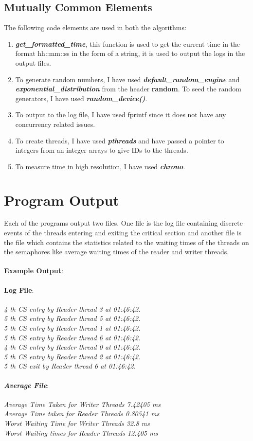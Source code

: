 \documentclass[a4paper,12pt]{report}
\begin{document}
\subsection{Mutually Common Elements}
The following code elements are used in both the algorithms:
\begin{enumerate}
\item \textbf{\textit{get\_formatted\_time}}, this function is used to get the current time in the format hh::mm::ss in the form of a string, it is used to output the logs in the output  files.
\item To generate random numbers, I have used \textbf{\textit{default\_random\_engine}} and  \textbf{\textit{exponential\_distribution}} from the header \textbf{random}. To seed the random generators, I have used \textit{\textbf{random\_device{}()}}.
\item To output to the log file, I have used fprintf since it does not have any concurrency related issues.
\item To create threads, I have used \textit{\textbf{pthreads}} and have passed a pointer to integers from an integer arrays to give IDs to the threads.
\item To measure time in high resolution, I have used \textit{\textbf{chrono}}.
\end{enumerate}
\newpage
\section{Program Output}
Each of the programs output two files. One file is the log file containing discrete events of the threads entering and exiting the critical section and another file is the file which contains the statistics related to the waiting times of the threads on the semaphores like average waiting times of the reader and writer threads.\\\\
\textbf{Example Output}:\\\\
\textbf{Log File}:\\\\
\textit{4 th CS entry by Reader thread 3 at 01:46:42.\\
5 th CS entry by Reader thread 5 at 01:46:42.\\
5 th CS entry by Reader thread 1 at 01:46:42.\\
5 th CS entry by Reader thread 6 at 01:46:42.\\
4 th CS entry by Reader thread 0 at 01:46:42.\\
5 th CS entry by Reader thread 2 at 01:46:42.\\
5 th CS exit by Reader thread 6 at 01:46:42.\\\\}
\textit{\textbf{Average File}}:\\\\
\textit{Average Time Taken for Writer Threads 7.42405 ms\\
Average Time taken for Reader Threads 0.80541 ms\\
Worst Waiting Time for Writer Threads 32.8 ms\\
Worst Waiting times for Reader Threads 12.405 ms\\}
\end{document}
